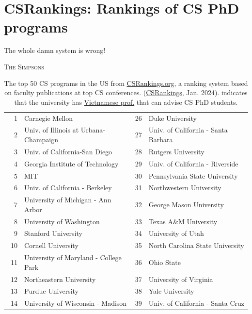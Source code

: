 \documentclass[oneside,11pt,dvipsnames]{book}
\def\chapterinfo#1{%
  \addcontentsline{toc}{chapterinfo}{%
    \noexpand\numberline{}\color{black}{#1}}%
}
\newcommand{\red}[1]{{\color{red}{#1}}}
\begin{document}
\chapter{CSRankings: Rankings of CS PhD programs}\label{sec:ranking}
\chapterinfo{CSRankings.org is a ranking system based on faculty publications at top CS conferences.}

\epigraph{\vspace{-0.2in} The whole damn system is wrong!}{\textsc{The Simpsons}}


\begin{table}[h]
  \centering
  \small
  \caption{The top 50 CS programs in the US from \href{https://www.csrankings.org}{CSRankings.org}, a ranking system  based on faculty publications at top CS conferences. (\href{https://csrankings.org}{CSRankings}, Jan. 2024). \red{$^*$} indicates that the university has \href{https://github.com/dynaroars/dynaroars.github.io/wiki/Viet-CS-Profs-US}{Vietnamese prof.} that can advise CS PhD students.}\label{tab:ranking}
  \begin{tabular}{rl|rl}
    \toprule
    1 & Carnegie Mellon & 26 & Duke University \\
    2 & Univ. of Illinois at Urbana-Champaign\red{$^*$}  & 27 & Univ. of California - Santa Barbara \\
    3 & Univ. of California-San Diego & 28 & Rutgers University\red{$^*$} \\
    4 & Georgia Institute of Technology & 29 & Univ. of California - Riverside\\
    5 & MIT                            & 30 & Pennsylvania State University  \\
    6 & Univ. of California - Berkeley& 31 & Northwestern University\\
    7 & University of Michigan - Ann Arbor\red{$^*$}   & 32& George Mason University\red{$^*$}\\
    8 & University of Washington      &33 &  Texas A\&M University\red{$^*$} \\
    9 &  Stanford University  &34&  University of Utah \\
    10 & Cornell University  & 35 &  North Carolina State University\\\
    11 & University of Maryland - College Park &  36& Ohio State \\
    12 & Northeastern University\red{$^*$} &37& University of Virginia  \\
    13 & Purdue University &38& Yale University \\
    14 & University of Wisconsin - Madison\red{$^*$} &39 & Univ. of California - Santa Cruz \\

\end{tabular}
\end{table}
\end{document}

